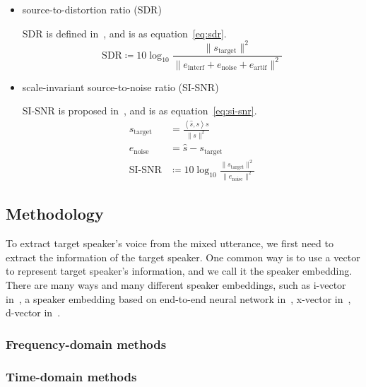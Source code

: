 \begin{itemize}
    \item source-to-distortion ratio (SDR)

    SDR is defined in~\cite{performance_measurement}, and is as equation~\ref{eq:sdr}.
    \begin{equation}
        \text{SDR} \coloneqq 10\log_{10}\frac{\| s_{\text{target}} \|^2}{\| e_{\text{interf}} + e_{\text{noise}} + e_{\text{artif}} \|^2}
        \label{eq:sdr}
    \end{equation}

    \item scale-invariant source-to-noise ratio (SI-SNR)

    SI-SNR is proposed in~\cite{tasnet}, and is as equation~\ref{eq:si-snr}.
    \begin{equation}
        \begin{aligned}
            s_{\text{target}} &= \frac{\left< \hat{s}, s \right>s}{\| s \|^2} \\
            e_{\text{noise}} &= \hat{s} - s_{\text{target}} \\
            \text{SI-SNR} &\coloneqq 10\log_{10}\frac{\| s_{\text{target}} \|^2}{\| e_{\text{noise}} \|^2}
        \end{aligned}\label{eq:si-snr}
    \end{equation}
\end{itemize}

\subsection{Methodology}\label{subsec:methodology}

To extract target speaker's voice from the mixed utterance, we first need to extract the information of the target speaker.
One common way is to use a vector to represent target speaker's information, and we call it the speaker embedding.
There are many ways and many different speaker embeddings, such as i-vector in~\cite{i-vector}, a speaker embedding based on end-to-end neural network in~\cite{deep_speaker}, x-vector in~\cite{x-vector}, d-vector in~\cite{d-vector}.

\subsubsection{Frequency-domain methods}

\subsubsection{Time-domain methods}
